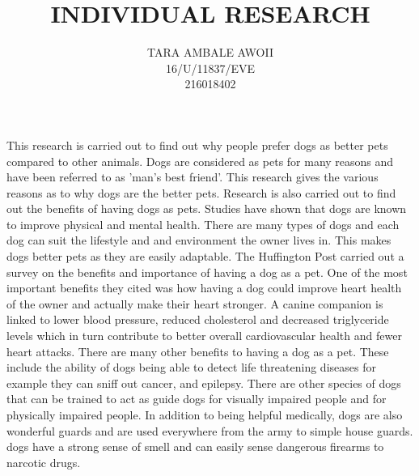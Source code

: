 \documentclass[10pt,a4paper]{report}
\author{
		TARA AMBALE AWOII\\
		 16/U/11837/EVE \\
		 216018402
		}
\title{INDIVIDUAL RESEARCH}
\begin{document}

\begin{flushleft}
	This research is carried out to find out why people prefer dogs as better pets compared to other animals. Dogs are considered as pets for many reasons and have been referred to as 'man's best friend'. This research gives the various reasons as to why dogs are the better pets.
	\linebreak
	\linebreak
	Research is also carried out to find out the benefits of having dogs as pets.
	\linebreak
	\linebreak
	Studies have shown that dogs are known to improve physical and mental health. There are many types of dogs and each dog can suit the lifestyle and and environment the owner lives in. This makes dogs better pets as they are easily adaptable.
	\linebreak
	\linebreak
	 The Huffington Post carried out a survey on the benefits and importance of having a dog as a pet. One of the most important benefits they cited was how having a dog could improve heart health of the owner and actually make their heart stronger. A canine companion is linked to lower blood pressure, reduced cholesterol and decreased triglyceride levels which in turn contribute to better overall cardiovascular health and fewer heart attacks. 
	 \linebreak
	 \linebreak
	 There are many other benefits to having a dog as a pet. These include the ability of dogs being able to detect life threatening diseases for example they can sniff out cancer, and epilepsy. There are other species of dogs that can be trained to act as guide dogs for visually impaired people and for physically impaired people.
	 \linebreak
	 \linebreak
	 \newpage 
	 In addition to being helpful medically, dogs are also wonderful guards and are used everywhere from the army to simple house guards. dogs have a strong sense of smell and can easily sense dangerous firearms to narcotic drugs.
\end{flushleft}
\end{document}
